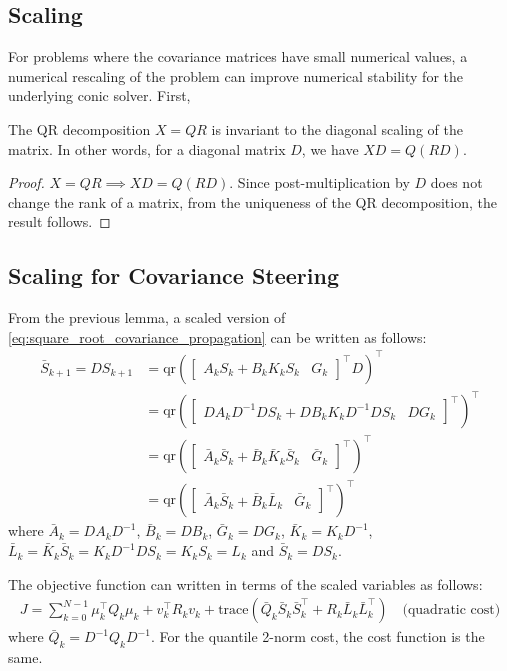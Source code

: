 \documentclass{article}
\begin{document}
\subsection{Scaling}
For problems where the covariance matrices have small numerical values, a numerical rescaling of the problem can improve numerical stability for the underlying conic solver. First, 
\begin{lemma}
	The QR decomposition $X=QR$ is invariant to the diagonal scaling of the matrix. In other words, for a diagonal matrix $D$, we have $XD = Q (RD)$.
\end{lemma}
\begin{proof}
	\(X=QR \implies XD = Q (RD)\). Since post-multiplication by $D$ does not change the rank of a matrix, from the uniqueness of the QR decomposition, the result follows.
\end{proof}

\subsection{Scaling for Covariance Steering}
From the previous lemma, a scaled version of \cref{eq:square_root_covariance_propagation} can be written as follows:
\begin{align*}
	\bar{S}_{k+1} = D S_{k+1} &= \mathrm{qr}( \begin{bmatrix} A_k S_k + B_k K_k S_k & G_k \end{bmatrix}^\top D)^\top \\
	&= \mathrm{qr}(\begin{bmatrix} D A_k D^{-1} D S_k + D B_k K_k D^{-1} D S_k & D G_k \end{bmatrix}^\top)^\top \\
	&= \mathrm{qr}(\begin{bmatrix} \bar{A}_k \bar{S}_k + \bar{B}_k \bar{K}_k \bar{S}_k & \bar{G}_k \end{bmatrix}^\top)^\top \\
	&= \mathrm{qr}(\begin{bmatrix} \bar{A}_k \bar{S}_k + \bar{B}_k \bar{L}_k & \bar{G}_k \end{bmatrix}^\top)^\top
\end{align*}
where $\bar{A}_k = D A_k D^{-1}$, $\bar{B}_k = D B_k$, $\bar{G}_k = D G_k$, $\bar{K}_k = K_k D^{-1}$, $\bar{L}_k = \bar{K}_k \bar{S}_k = K_k D^{-1} D S_k = K_k S_k = L_k$ and $\bar{S}_k = D S_k$.

The objective function can written in terms of the scaled variables as follows:
\begin{align*}
	J = \sum_{k=0}^{N-1} \mu_k^\top Q_k \mu_k + v_k^\top R_k v_k + \mathrm{trace} (\bar{Q}_k \bar{S}_k \bar{S}_k^\top + R_k \bar{L}_k \bar{L}_k^\top) \quad \text{(quadratic cost)}
\end{align*}
where $\bar{Q}_k = D^{-1} Q_k D^{-1}$. For the quantile 2-norm cost, the cost function is the same.
\end{document}

